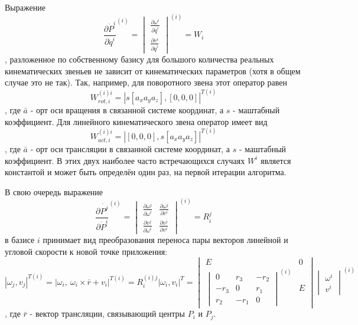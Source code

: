 \documentclass[12pt,a4paper,titlepage]{article}
\begin{document}
Выражение 
\begin{equation}\label{}
\frac{\partial{\dot{P}^i}}{\partial{\dot{q}^i}}^{(i)}
=
\begin{vmatrix}
\frac{\partial{\omega^i}}{\partial{\dot{q}^i}}\\
\frac{\partial{v^i}}{\partial{\dot{q}^i}}
\end{vmatrix}^{(i)}=W_i
\end{equation},
разложенное по собственному базису для большого количества реальных кинематических звеньев не зависит от кинематических параметров (хотя в общем случае это не так). Так, например, для поворотного звена этот оператор равен 
\begin{equation}\label{}
W_{rot,i}^{(i)i} = |s[a_x a_y a_z], [0, 0, 0]|^{T(i)}
\end{equation}, где $\bar{a}$ - орт оси вращения в связанной системе координат, а $s$ - маштабный коэффициент. Для линейного кинематического звена оператор имеет вид 
\begin{equation}\label{}
W_{act,i}^{(i)i} = |[0, 0, 0], s[a_x a_y a_z]|^{T(i)}
\end{equation}, где $\bar{a}$ - орт оси трансляции в связанной системе координат, а $s$ - маштабный коэффициент. 
В этих двух наиболее часто встречающихся случаях $W^i$ является константой и может быть определён один раз, на первой итерации алгоритма.

В свою очередь выражение
\begin{equation}\label{}
\frac{\partial{\dot{P^j}}}{\partial{\dot{P}^i}}^{(i)}
=
\begin{vmatrix}
\frac{\partial{\omega^j}}{\partial{\omega^i}} & \frac{\partial{\omega^j}}{\partial{v^i}} \\
\frac{\partial{v^j}}{\partial{\omega^i}} & \frac{\partial{v^j}}{\partial{v^i}}
\end{vmatrix}^{(i)}=R_i^j
\end{equation}
в базисе $i$ принимает вид преобразования переноса пары векторов линейной и угловой скорости к новой точке приложения:
\begin{equation}\label{}
|\omega_j, v_j|^{T(i)} = |\omega_i,\ \omega_i \times \bar{r} + v_i|^{T(i)} = R^{(i)j}_{i}|\omega_i, v_i|^T=
\begin{vmatrix}
E & 0\\
\begin{vmatrix}
0 & r_3 & -r_2\\
-r_3 & 0 & r_1\\
r_2 & -r_1 & 0
\end{vmatrix}
^{(i)} & E
\end{vmatrix}
\begin{vmatrix}
\omega^i\\
v^i
\end{vmatrix}^{(i)}
\end{equation}, где $\bar{r}$ - вектор трансляции, связывающий центры $P_i$ и $P_j$.
\end{document}
